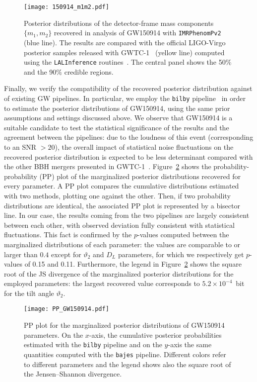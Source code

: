 \documentclass[prd,aps,twocolumn,a4paper,showkeys,nofootinbib,floatfix]{revtex4-1}
\begin{document}
\begin{figure}[t]
	\centering 
	\texttt{[image: 150914\_m1m2.pdf]}
	\caption{Posterior distributions
		of the detector-frame mass components $\{m_1,m_2\}$
		recovered in analysis of GW150914 with {\tt IMRPhenomPv2} (blue line).
		The results are compared with the official LIGO-Virgo posterior samples released with GWTC-1~\cite{LIGOScientific:2018mvr} (yellow line)
		computed using the {\tt LALInference} routines~\cite{Veitch:2014wba,lalsuite}.
		The central panel shows the 50\% and the 90\% credible regions.}
	\label{fig:150914_compare}
\end{figure}

Finally, we verify the compatibility of
  the recovered posterior distribution against of existing GW pipelines.
In particular, we employ the {\tt bilby} pipeline~\cite{Ashton:2018jfp,Smith:2019ucc,Romero-Shaw:2020owr}
in order to estimate the posterior distributions 
of GW150914, using the same prior assumptions and settings
discussed above.
We observe that
GW150914 is a suitable candidate to test the statistical
significance of the results and the agreement between the pipelines:
due to the loudness of this event (corresponding to an SNR $> 20$), 
the overall impact of statistical noise fluctuations on the recovered posterior distribution is expected to be less determinant
compared with the other BBH mergers presented in GWTC-1~\cite{LIGOScientific:2018mvr}. 
Figure~\ref{fig:pp_gw150914} shows the probability-probability (PP) plot
of the marginalized posterior distributions recovered for every parameter.
A PP plot compares the cumulative distributions estimated with 
two methods, plotting one against the other. Then, if two probability
distributions are identical, the associated PP plot is represented 
by a bisector line. 
In our case, the results coming from the two pipelines 
are largely consistent between each other, 
with observed deviation fully consistent with statistical fluctuations.
This fact is confirmed by the $p$-values
computed between the marginalized distributions
of each parameter: the values are comparable to or 
larger than $0.4$ except for $\vartheta_2$ and $D_L$ parameters,
for which we respectively get $p$-values of 0.15 and 0.11.
Furthermore, the legend in Figure~\ref{fig:pp_gw150914}
shows the square root of the 
JS divergence 
of the marginalized posterior distributions for the employed parameters:
the largest recovered value corresponds to $5.2\times 10^{-4}$~bit
for the tilt angle $\vartheta_2$.

\begin{figure}[t]
	\centering 
	\texttt{[image: PP\_GW150914.pdf]}
	\caption{PP plot for the marginalized posterior distributions of GW150914 parameters. On the $x$-axis, the cumulative posterior probabilities estimated with the {\tt bilby} pipeline and on the $y$-axis the same quantities computed with the {\tt bajes} pipeline.
		Different colors refer to different parameters and the legend shows also the square root of the Jensen–Shannon divergence.}
	\label{fig:pp_gw150914}
\end{figure}
\end{document}
